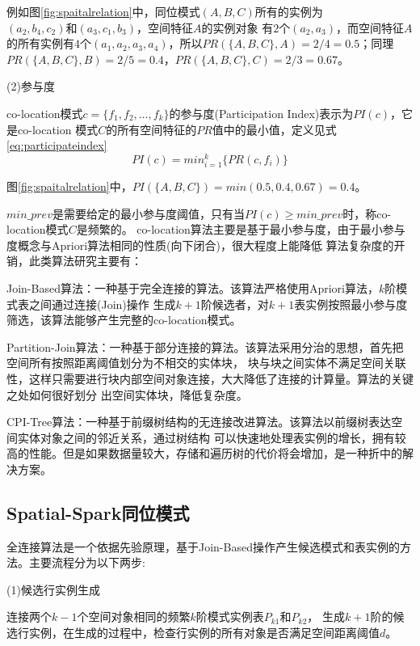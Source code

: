 例如图\ref{fig:spaitalrelation}中，同位模式$(A,B,C)$所有的实例为$(a_2,b_4,c_2)\text{和}(a_3,c_1,b_3)$，空间特征$A$的实例对象
有$2$个$(a_2,a_3)$，而空间特征$A$的所有实例有$4$个$(a_1,a_2,a_3,a_4)$，所以$PR(\{A,B,C\},A)=2/4=0.5$；同理
$PR(\{A,B,C\},B)=2/5=0.4$，$PR(\{A,B,C\},C)=2/3=0.67$。

(2)参与度

co-location模式$c=\{f_1,f_2,\ldots,f_k\}$的参与度(Participation Index)表示为$PI(c)$，它是co-location
模式$C$的所有空间特征的$PR$值中的最小值，定义见式\eqref{eq:participateindex}
\begin{equation}
\label{eq:participateindex}
PI(c)=min_{i=1}^{k}\{PR(c,f_i)\}
\end{equation}

图\ref{fig:spaitalrelation}中，$PI(\{A,B,C\})=min(0.5,0.4,0.67)=0.4$。

$min\_prev$是需要给定的最小参与度阈值，只有当$PI(c) \ge min\_prev$时，称co-location模式$C$是频繁的。
co-location算法主要是基于最小参与度，由于最小参与度概念与Apriori算法相同的性质(向下闭合)，很大程度上能降低
算法复杂度的开销，此类算法研究主要有：

Join-Based算法：一种基于完全连接的算法。该算法严格使用Apriori算法，$k$阶模式表之间通过连接(Join)操作
生成$k+1$阶候选者，对$k+1$表实例按照最小参与度筛选，该算法能够产生完整的co-location模式。

Partition-Join算法：一种基于部分连接的算法。该算法采用分治的思想，首先把空间所有按照距离阈值划分为不相交的实体块，
块与块之间实体不满足空间关联性，这样只需要进行块内部空间对象连接，大大降低了连接的计算量\cite{Yoo2004A}。算法的关键之处如何很好划分
出空间实体块，降低复杂度。

CPI-Tree算法：一种基于前缀树结构的无连接改进算法\cite{Wang2009Efficient}。该算法以前缀树表达空间实体对象之间的邻近关系，通过树结构
可以快速地处理表实例的增长，拥有较高的性能。但是如果数据量较大，存储和遍历树的代价将会增加，是一种折中的解决方案。

\subsection{Spatial-Spark同位模式}

全连接算法是一个依据先验原理，基于Join-Based操作产生候选模式和表实例的方法。主要流程分为以下两步:

(1)候选行实例生成

连接两个$k-1$个空间对象相同的频繁$k$阶模式实例表$P_{k1}$和$P_{k2}$，
生成$k+1$阶的候选行实例，在生成的过程中，检查行实例的所有对象是否满足空间距离阈值$d$。

